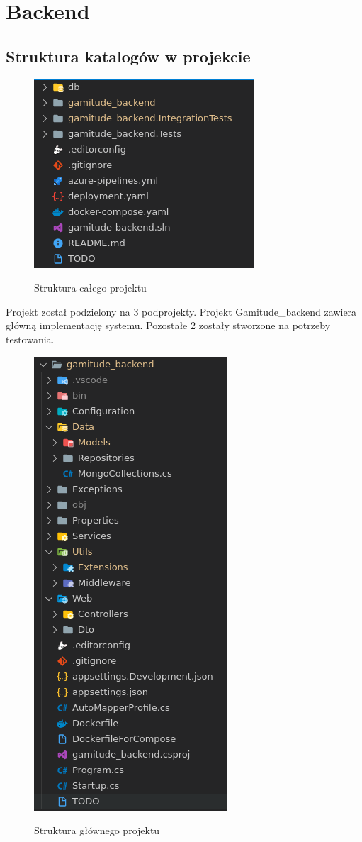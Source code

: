 \documentclass[a4paper,11pt]{report}
\begin{document}
\section{Backend}
\label{subsec:bib_back}
\subsection{Struktura katalogów w projekcie}
\begin{figure}[H]
	\centering
	\includegraphics[scale=0.6]{implementacja/backend/struktura_folderow}\\
	\caption{Struktura całego projektu}
	\label{fig:folders}
\end{figure}
Projekt został podzielony na 3 podprojekty. Projekt Gamitude_backend zawiera główną implementację systemu.
Pozostałe 2 zostały stworzone na potrzeby testowania.
\begin{figure}[H]
	\centering
	\includegraphics[scale=0.5]{implementacja/backend/struktura_folderow_gamitude_backend}\\
	\caption{Struktura głównego projektu}
	\label{fig:gamitude_struct}
\end{figure}
\end{document}
